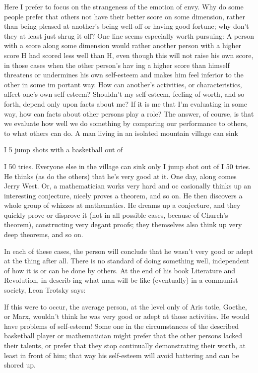 \documentclass[11pt,openany]{book}
\begin{document}
Here I prefer to focus on the strangeness of the emotion of envy. Why do some people prefer that others not have their better score on some dimension, rather than being pleased at another's being well-off or having good fortune; why don't they at least just shrug it off? One line seems especially worth pursuing: A person with a score along some dimension would rather another person with a higher score H had scored less well than H, even though this will not raise his own score, in those cases when the other person's hav ing a higher score than himself threatens or undermines his own self-esteem and makes him feel inferior to the other in some im portant way. How can another's activities, or characteristics, affect one's own self-esteem? Shouldn't my self-esteem, feeling of worth, and so forth, depend only upon facts about me? If it is me that I'm evaluating in some way, how can facts about other persons play a role? The answer, of course, is that we evaluate how well we do something by comparing our performance to others, to what others can do. A man living in an isolated mountain village can sink 

I 5 jump shots with a basketball out of 

I 50 tries. Everyone else in the village can sink only I jump shot out of I 50 tries. He thinks (as do the others) that he's very good at it. One day, along comes Jerry West. Or, a mathematician works very hard and oc casionally thinks up an interesting conjecture, nicely proves a theorem, and so on. He then discovers a whole group of whizzes at mathematics. He dreams up a conjecture, and they quickly prove or disprove it (not in all possible cases, because of Church's theorem), constructing very degant proofs; they themselves also think up very deep theorems, and so on. 

In each of these cases, the person will conclude that he wasn't very good or adept at the thing after all. There is no standard of doing something well, independent of how it is or can be done by others. At the end of his book Literature and Revolution, in describ ing what man will be like (eventually) in a communist society, Leon Trotsky says: 

If this were to occur, the average person, at the level only of Aris totle, Goethe, or Marx, wouldn't think he was very good or adept at those activities. He would have problems of self-esteem! Some one in the circumstances of the described basketball player or mathematician might prefer that the other persons lacked their talents, or prefer that they stop continually demonstrating their worth, at least in front of him; that way his self-esteem will avoid battering and can be shored up. 
\end{document}

